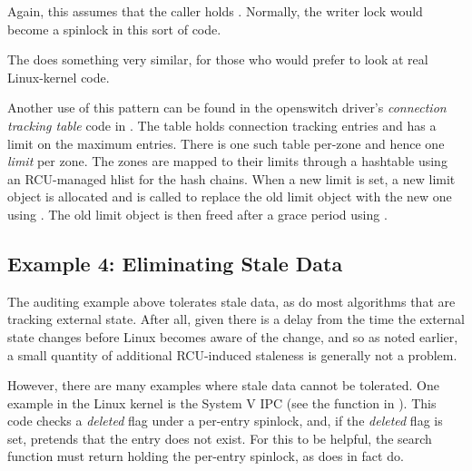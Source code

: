 Again, this assumes that the caller holds .
Normally, the
writer lock would become a spinlock in this sort of code.

The  does something very similar, for those who would
prefer to look at real Linux-kernel code.

Another use of this pattern can be found in the openswitch driver's
\emph{connection tracking table} code in .
The table holds connection tracking
entries and has a limit on the maximum entries.
There is one such table
per-zone and hence one \emph{limit} per zone.
The zones are mapped to their limits
through a hashtable using an RCU-managed hlist for the hash chains.
When a new
limit is set, a new limit object is allocated and  is called
to replace the old limit object with the new one using .
The old limit object is then freed after a grace period using .


\subsection{Example 4: Eliminating Stale Data}

The auditing example above tolerates stale data, as do most algorithms
that are tracking external state.
After all, given there is a delay
from the time the external state changes before Linux becomes aware
of the change, and so as noted earlier, a small quantity of additional
RCU-induced staleness is generally not a problem.

However, there are many examples where stale data cannot be tolerated.
One example in the Linux kernel is the System V IPC (see the 
function in ).
This code checks a \emph{deleted} flag under a
per-entry spinlock, and, if the \emph{deleted} flag is set, pretends that the
entry does not exist.
For this to be helpful, the search function must
return holding the per-entry spinlock, as  does in fact do.

\QuickQuizEnd


